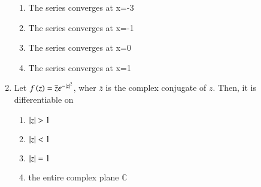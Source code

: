 \documentclass[journal,12pt,onecolumn]{IEEEtran}
\theoremstyle{remark}
\begin{document}
\begin{enumerate}
	\begin{enumerate}
	\item The series converges at x=-3
	\item The series converges at x=-1		  \item The series converges at x=0
	\item The series converges at x=1
\end{enumerate}
\item Let $f\left(z\right)= \overline{z}e^{-\left\vert z\right\vert^2}$, wher $\overline{z}$ is the complex conjugate of $z$. Then, it is differentiable on
	\begin{enumerate}
		\item $\left\vert z\right\vert>1$
		\item $\left\vert z\right\vert<1$
		\item $\left\vert z\right\vert=1$
		\item the entire complex plane $\mathbb{C}$
	\end{enumerate}
\end{enumerate}
\end{document}
